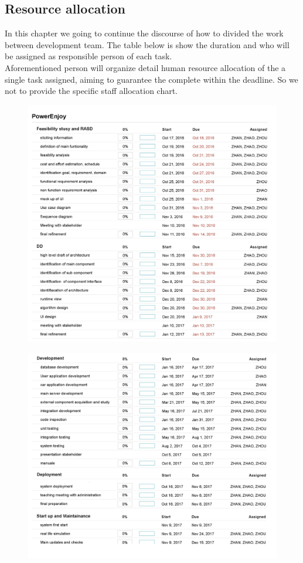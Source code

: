 \documentclass{article}
\begin{document}
\newpage
\subsection{Resource allocation}
In this chapter we going to continue the discourse of how to divided the work between development team. The table below is show the duration and who will be assigned as responsible person of each task.\\ Aforementioned person will organize detail human resource allocation of the a single task assigned, aiming to guarantee the complete within the deadline. So we not to provide the specific staff allocation chart.

\begin{figure}[H]
\centering
\includegraphics[width=\textwidth]{resource1.png} 
\end{figure}

\newpage
\begin{figure}[H]
\centering
\includegraphics[width=\textwidth]{resource2.png}   
\end{figure}
\end{document}
